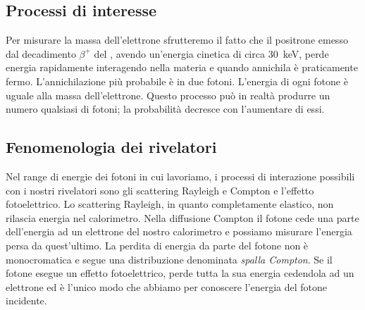%
%

\subsection{Processi di interesse}

Per misurare la massa dell'elettrone sfrutteremo il fatto che il positrone emesso dal decadimento $\beta^+$ del \na{}, avendo un'energia cinetica di circa \SI{30}{keV},
perde energia rapidamente interagendo nella materia e quando annichila è praticamente fermo. 
L'annichilazione più probabile è in due fotoni. L'energia di ogni fotone è uguale alla massa dell'elettrone. Questo processo può in realtà produrre un numero qualsiasi di fotoni; la probabilità decresce con l'aumentare di essi.


\subsection{Fenomenologia dei rivelatori}

Nel range di energie dei fotoni in cui lavoriamo, i processi di interazione possibili con i nostri rivelatori sono gli scattering Rayleigh e Compton e l'effetto fotoelettrico.
Lo scattering Rayleigh, in quanto completamente elastico, non rilascia energia nel calorimetro.
Nella diffusione Compton il fotone cede una parte dell'energia ad un elettrone del nostro calorimetro e possiamo misurare l'energia persa da quest'ultimo. La perdita di energia da parte del fotone non è monocromatica e segue una distribuzione denominata \emph{spalla Compton}.
Se il fotone esegue un effetto fotoelettrico, perde tutta la sua energia cedendola ad un elettrone ed è l'unico modo che abbiamo per conoscere l'energia del fotone incidente.

